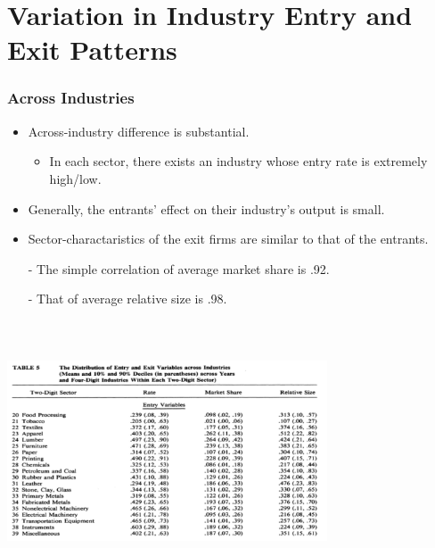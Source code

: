 \documentclass[dvipdfmx,12pt]{beamer}
\begin{document}
\section{Variation in Industry Entry and Exit Patterns}
\begin{frame}\frametitle{Across Industries}

 \begin{itemize}
 
 \item Across-industry difference is substantial.
 
  \begin{itemize}
  
  \item In each sector, there exists an industry whose entry rate is extremely high/low.
  
  \end{itemize}
 
 \item Generally, the entrants' effect on their industry's output is small.
 
 \item Sector-charactaristics of the exit firms are similar to that of the entrants.
 
 - The simple correlation of average market share is .92.
 
 - That of average relative size is .98.
 
 \end{itemize}

\end{frame}

\begin{frame}

\begin{center}

\includegraphics[width=9.5cm,height=7.75cm]{DRS_T5a.pdf}

\end{center}

\end{frame}
\end{document}
